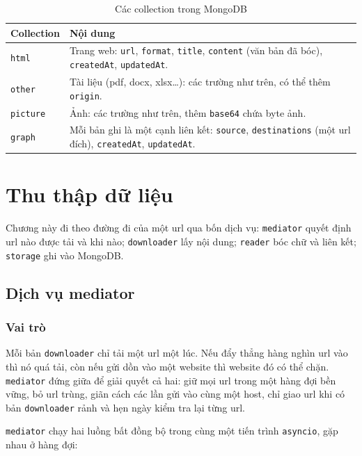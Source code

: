 \documentclass[12pt,a4paper]{report}
\begin{document}
\begin{table}[ht]
\centering
\caption{Các collection trong MongoDB}\label{tab:mongo}
\begin{tabularx}{\textwidth}{l L}
\toprule
Collection & Nội dung \\
\midrule
\texttt{html} & Trang web: \texttt{url}, \texttt{format}, \texttt{title}, \texttt{content} (văn bản đã bóc), \texttt{createdAt}, \texttt{updatedAt}. \\
\texttt{other} & Tài liệu (pdf, docx, xlsx\ldots): các trường như trên, có thể thêm \texttt{origin}. \\
\texttt{picture} & Ảnh: các trường như trên, thêm \texttt{base64} chứa byte ảnh. \\
\texttt{graph} & Mỗi bản ghi là một cạnh liên kết: \texttt{source}, \texttt{destinations} (một url đích), \texttt{createdAt}, \texttt{updatedAt}. \\
\bottomrule
\end{tabularx}
\end{table}

\chapter{Thu thập dữ liệu}\label{ch:crawler}

Chương này đi theo đường đi của một url qua bốn dịch vụ: \texttt{mediator} quyết định url nào được tải và khi nào;
\texttt{downloader} lấy nội dung; \texttt{reader} bóc chữ và liên kết; \texttt{storage} ghi vào MongoDB.

\section{Dịch vụ mediator}

\subsection{Vai trò}

Mỗi bản \texttt{downloader} chỉ tải một url một lúc. Nếu đẩy thẳng hàng nghìn url vào thì nó quá tải, còn nếu gửi dồn
vào một website thì website đó có thể chặn. \texttt{mediator} đứng giữa để giải quyết cả hai: giữ mọi url trong một hàng
đợi bền vững, bỏ url trùng, giãn cách các lần gửi vào cùng một host, chỉ giao url khi có bản \texttt{downloader} rảnh
và hẹn ngày kiểm tra lại từng url.

\texttt{mediator} chạy hai luồng bất đồng bộ trong cùng một tiến trình \texttt{asyncio}, gặp nhau ở hàng đợi:
\end{document}

